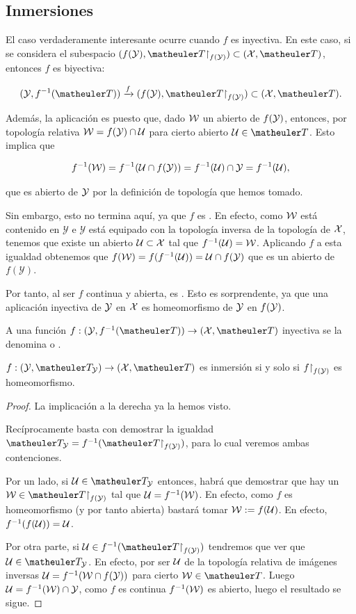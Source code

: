 \subsection{Inmersiones}
El caso verdaderamente interesante ocurre cuando $f$ es inyectiva. En este caso, si se considera el subespacio $(f(\mathcal{\Y}),\T\restriction_{f(\mathcal{\Y})}) \subset (\mathcal{\X},\T)$, entonces $f$ es biyectiva:

\[(\mathcal{\Y},f^{-1}(\T)) \xrightarrow{f} (f(\mathcal{\Y}),\T\restriction_{f(\mathcal{\Y})}) \subset (\mathcal{\X},\T).\]

Además, la aplicación es  puesto que, dado $\mathcal{W}$ un abierto de $f(\mathcal{\mathcal{Y}})$, entonces, por topología relativa $\mathcal{W}=f(\mathcal{Y})\cap \mathcal{U}$ para cierto abierto $\U\in \T$. Esto implica que

\[f^{-1}(\mathcal{W})=f^{-1}(\mathcal{U}\cap f(\mathcal{\mathcal{Y}}))=f^{-1}(\mathcal{U})\cap \mathcal{\mathcal{Y}}=f^{-1}(\mathcal{U}),\]

que es abierto de $\mathcal{\mathcal{Y}}$ por la definición de topología que hemos tomado.

Sin embargo, esto no termina aquí, ya que $f$ es . En efecto, como $\mathcal{W}$ está contenido en $\mathcal{Y}$ e $\mathcal{Y}$ está equipado con la topología inversa de la topología de $\mathcal{X}$, tenemos que existe un abierto $\mathcal{U} \subset \mathcal{X}$ tal que $f^{-1}(\mathcal{U}) = \mathcal{W}$. Aplicando $f$ a esta igualdad obtenemos que $f(\mathcal{W}) = f(f^{-1}(\mathcal{U})) = \mathcal{U} \cap f(\mathcal{Y})$ que es un abierto de $f(\mathcal{Y})$.

Por tanto, al ser $f$ continua y abierta, es . Esto es sorprendente, ya que una aplicación inyectiva de $\mathcal{\mathcal{Y}}$ en $\mathcal{\mathcal{X}}$ es homeomorfismo de $\mathcal{\mathcal{Y}}$ en $f(\mathcal{\mathcal{Y}})$.

\begin{defi}
	A una función $f:(\Y,f^{-1}(\T))\to(\X,\T)$ inyectiva se la denomina  o .
\end{defi}
\begin{prop}[Caracterización]
	$f:(\Y,\T_\Y)\to(\X,\T)$ es inmersión si y solo si $f\mathord{\upharpoonright}_{f(\mathcal{Y})}$ es homeomorfismo.
\end{prop}
\begin{proof}
	La implicación a la derecha ya la hemos visto.
	
	Recíprocamente basta con demostrar la igualdad $\T_\Y=f^{-1}(\T\restriction_{f(\Y)})$, para lo cual veremos ambas contenciones.
	
	Por un lado, si $\U\in\T_\Y$ entonces, habrá que demostrar que hay un $\W\in\T\restriction_{f(\Y)}$ tal que $\mathcal{U}=f^{-1}(\mathcal{W})$. En efecto, como $f$ es homeomorfismo (y por tanto abierta) bastará tomar $\mathcal{W}:=f(\mathcal{U})$. En efecto, $f^{-1}(f(\mathcal{U}))=\mathcal{U}$.
	
	Por otra parte, si $\U\in f^{-1}(\T\restriction_{f(\Y)})$ tendremos que ver que $\U\in \T_\Y$. En efecto, por ser $\mathcal{U}$ de la topología relativa de imágenes inversas $\mathcal{U}=f^{-1}(\mathcal{W}\cap f(\mathcal{Y}))$ para cierto $\W\in \T$. Luego $\mathcal{U}=f^{-1}(\mathcal{W})\cap \mathcal{Y}$, como $f$ es continua $f^{-1}(\mathcal{W})$ es abierto, luego el resultado se sigue.
\end{proof}
